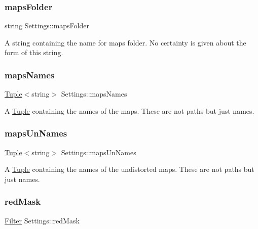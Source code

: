 \mbox{\label{class_settings_aeddfd4457036a14cb0a48d50d9e6ccfe}} 
\subsubsection{\texorpdfstring{mapsFolder}{mapsFolder}}
{\footnotesize\ttfamily string Settings\+::maps\+Folder}



A string containing the name for maps folder. No certainty is given about the form of this string. 

\mbox{\label{class_settings_a4a464c938e96639861dc2deb773a2fb8}} 
\subsubsection{\texorpdfstring{mapsNames}{mapsNames}}
{\footnotesize\ttfamily \mbox{\hyperlink{class_tuple}{Tuple}}$<$string$>$ Settings\+::maps\+Names}



A \mbox{\hyperlink{class_tuple}{Tuple}} containing the names of the maps. These are not paths but just names. 

\mbox{\label{class_settings_a1866d578ad33e56429a88617a655f9c6}} 
\subsubsection{\texorpdfstring{mapsUnNames}{mapsUnNames}}
{\footnotesize\ttfamily \mbox{\hyperlink{class_tuple}{Tuple}}$<$string$>$ Settings\+::maps\+Un\+Names}



A \mbox{\hyperlink{class_tuple}{Tuple}} containing the names of the undistorted maps. These are not paths but just names. 

\mbox{\label{class_settings_a4ded995ae1c425f92ad712d2987dce71}} 
\subsubsection{\texorpdfstring{redMask}{redMask}}
{\footnotesize\ttfamily \mbox{\hyperlink{class_filter}{Filter}} Settings\+::red\+Mask}



